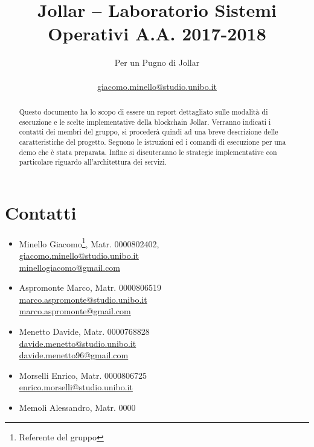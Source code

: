 \documentclass[12pt,a4paper]{article}
\title{Jollar -- Laboratorio Sistemi Operativi A.A. 2017-2018}
\author{Per un Pugno di Jollar \\
\\
\href{mailto:giacomo.minello@studio.unibo.it}{giacomo.minello@studio.unibo.it}}
\begin{document}
\maketitle

\begin{abstract}
\noindent Questo documento ha lo scopo di essere un report dettagliato sulle modalità di esecuzione e le scelte implementative della blockchain Jollar. Verranno indicati i contatti dei membri del gruppo, si procederà quindi ad una breve descrizione delle caratteristiche del progetto. Seguono le istruzioni ed i comandi di esecuzione per una demo che è stata preparata. Infine si discuteranno le strategie implementative con particolare riguardo all'architettura dei servizi.
\end{abstract}
\tableofcontents
\newpage
\section{Contatti}
\begin{tcolorbox}[colback=green!20!white,colframe=green!75!black,title=Contatti del gruppo]
\begin{itemize}
    \item Minello Giacomo\footnote{Referente del gruppo}, Matr. 0000802402, \\
    \href{mailto:giacomo.minello@studio.unibo.it}{giacomo.minello@studio.unibo.it} \\
    \href{mailto:minellogiacomo@gmail.com}{minellogiacomo@gmail.com}
    \item Aspromonte Marco, Matr. 0000806519 \\
    \href{marco.aspromonte@studio.unibo.it}{marco.aspromonte@studio.unibo.it}\\
    \href{marco.aspromonte@gmail.com}{marco.aspromonte@gmail.com}
    \item Menetto Davide, Matr. 0000768828 \\
    \href{davide.menetto@studio.unibo.it}{davide.menetto@studio.unibo.it}\\
    \href{davide.menetto96@gmail.com}{davide.menetto96@gmail.com}
    \item Morselli Enrico, Matr. 0000806725\\
    \href{enrico.morselli@studio.unibo.it}{enrico.morselli@studio.unibo.it}
    \item Memoli Alessandro, Matr. 0000  \\
\end{itemize}
\end{tcolorbox}
\newpage
\end{document}
